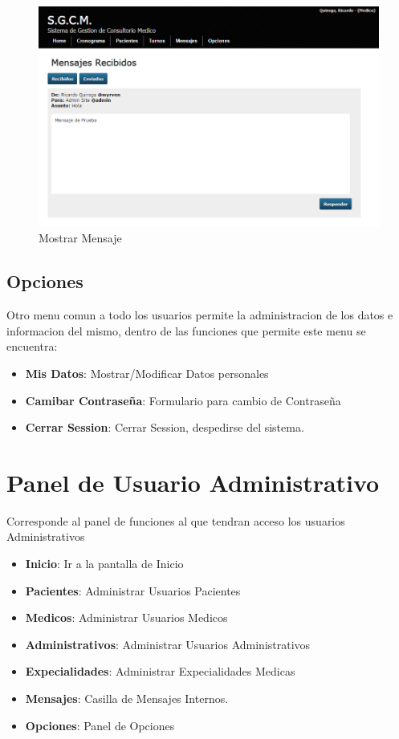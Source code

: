 \begin{figure}[H]
    \centering
    \includegraphics[scale=0.5]{resourse/mensaje-mostrar.png}
    \caption{Mostrar Mensaje}
    \label{fig:612}
\end{figure}

\subsection{Opciones}
Otro menu comun a todo los usuarios permite la administracion de los datos e
informacion del mismo, dentro de las funciones que permite este menu se encuentra:

\begin{itemize}
    \item \textbf{Mis Datos}: Mostrar/Modificar Datos personales
    \item \textbf{Camibar Contrase\~na}: Formulario para cambio de Contrase\~na
    \item \textbf{Cerrar Session}: Cerrar Session, despedirse del sistema.
\end{itemize}


\section{Panel de Usuario Administrativo}

Corresponde al panel de funciones al que tendran acceso los usuarios
Administrativos 

\begin{itemize}
    \item \textbf{Inicio}: Ir a la pantalla de Inicio
    \item \textbf{Pacientes}: Administrar Usuarios Pacientes
    \item \textbf{Medicos}: Administrar Usuarios Medicos
    \item \textbf{Administrativos}: Administrar Usuarios Administrativos
    \item \textbf{Expecialidades}: Administrar Expecialidades Medicas
    \item \textbf{Mensajes}: Casilla de Mensajes Internos.
    \item \textbf{Opciones}: Panel de Opciones
\end{itemize}


